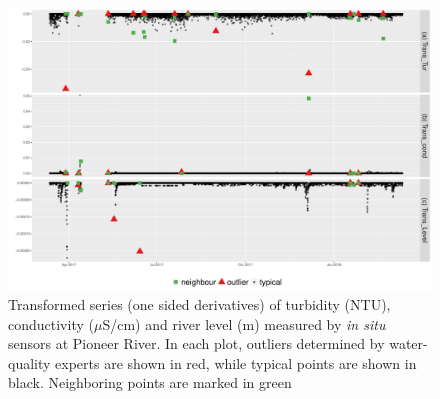 \documentclass[draft]{agujournal2018} %
\begin{document}
\begin{figure}[H]

{\centering \includegraphics[width=1\textwidth]{./fig/transdemoTCLPioneertrans-1.pdf}

}

\caption{Transformed series (one sided derivatives) of turbidity (NTU), conductivity ($\mu$S/cm) and river level (m) measured by \textit{in situ} sensors at Pioneer River. In each plot, outliers determined by water-quality experts are shown in red, while typical points are shown in black. \color{black} Neighboring points are marked in green \color{black}}\label{fig:transdemoTCLpioneerPng}
\end{figure}
\end{document}
